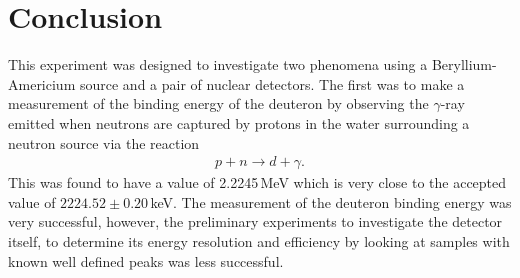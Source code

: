 \section{Conclusion} %
\label{sec:conclusion}
This experiment was designed to investigate two phenomena using a Beryllium-Americium source and a pair of nuclear detectors. The first was to make a measurement of the binding energy of the deuteron by observing the $\gamma$-ray emitted when neutrons are captured by protons in the water surrounding a neutron source via the reaction 
\begin{align}
	p + n \rightarrow d + \gamma.
\end{align}
This was found to have a value of 2.2245\,MeV which is very close to the accepted value of $2224.52\pm 0.20$\,keV. The measurement of the deuteron binding energy was very successful, however, the preliminary experiments to investigate the detector itself, to determine its energy resolution and efficiency by looking at samples with known well defined peaks was less successful. 

